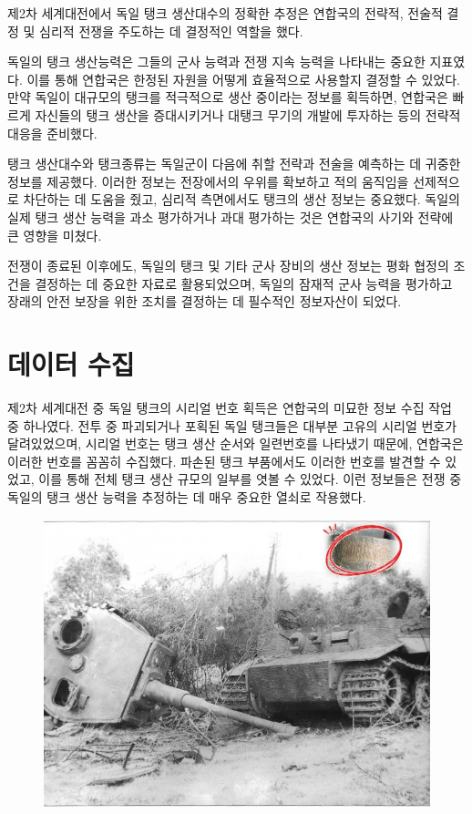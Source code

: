 \documentclass[
  letterpaper,
  chapter,a4paper,showtrims,openright,hidelinks]{oblivoir}
\begin{document}
제2차 세계대전에서 독일 탱크 생산대수의 정확한 추정은 연합국의 전략적,
전술적 결정 및 심리적 전쟁을 주도하는 데 결정적인 역할을 했다.

독일의 탱크 생산능력은 그들의 군사 능력과 전쟁 지속 능력을 나타내는
중요한 지표였다. 이를 통해 연합국은 한정된 자원을 어떻게 효율적으로
사용할지 결정할 수 있었다. 만약 독일이 대규모의 탱크를 적극적으로 생산
중이라는 정보를 획득하면, 연합국은 빠르게 자신들의 탱크 생산을
증대시키거나 대탱크 무기의 개발에 투자하는 등의 전략적 대응을 준비했다.

탱크 생산대수와 탱크종류는 독일군이 다음에 취할 전략과 전술을 예측하는
데 귀중한 정보를 제공했다. 이러한 정보는 전장에서의 우위를 확보하고 적의
움직임을 선제적으로 차단하는 데 도움을 줬고, 심리적 측면에서도 탱크의
생산 정보는 중요했다. 독일의 실제 탱크 생산 능력을 과소 평가하거나 과대
평가하는 것은 연합국의 사기와 전략에 큰 영향을 미쳤다.

전쟁이 종료된 이후에도, 독일의 탱크 및 기타 군사 장비의 생산 정보는 평화
협정의 조건을 결정하는 데 중요한 자료로 활용되었으며, 독일의 잠재적 군사
능력을 평가하고 장래의 안전 보장을 위한 조치를 결정하는 데 필수적인
정보자산이 되었다.

\hypertarget{uxb370uxc774uxd130-uxc218uxc9d1}{%
\section{데이터 수집}\label{uxb370uxc774uxd130-uxc218uxc9d1}}

제2차 세계대전 중 독일 탱크의 시리얼 번호 획득은 연합국의 미묘한 정보
수집 작업 중 하나였다. 전투 중 파괴되거나 포획된 독일 탱크들은 대부분
고유의 시리얼 번호가 달려있었으며, 시리얼 번호는 탱크 생산 순서와
일련번호를 나타냈기 때문에, 연합국은 이러한 번호를 꼼꼼히 수집했다.
파손된 탱크 부품에서도 이러한 번호를 발견할 수 있었고, 이를 통해 전체
탱크 생산 규모의 일부를 엿볼 수 있었다. 이런 정보들은 전쟁 중 독일의
탱크 생산 능력을 추정하는 데 매우 중요한 열쇠로 작용했다.

\begin{figure}

{\centering \includegraphics[width=6.29167in,height=\textheight]{images/german_tank_serial.jpg}

}

\end{figure}
\end{document}
